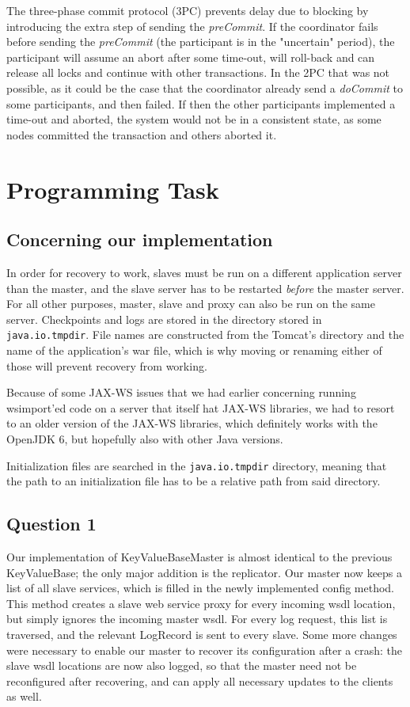 \documentclass[12pt,a4paper,fleqn]{article}
\begin{document}
The three-phase commit protocol (3PC) prevents delay due to blocking by introducing the extra step of sending the \emph{preCommit}. If the coordinator fails before sending the \emph{preCommit} (the participant is in the "uncertain" period), the participant will assume an abort after some time-out, will roll-back and can release all locks and continue with other transactions. In the 2PC that was not possible, as it could be the case that the coordinator already send a \emph{doCommit} to some participants, and then failed. If then the other participants implemented a time-out and aborted, the system would not be in a consistent state, as some nodes committed the transaction and others aborted it.

\section*{Programming Task} 
\label{sec:programming}

\subsection*{Concerning our implementation}
In order for recovery to work, slaves must be run on a different application server than the master, and the slave server has to be restarted \emph{before} the master server. For all other purposes, master, slave and proxy can also be run on the same server. Checkpoints and logs are stored in the directory stored in \texttt{java.io.tmpdir}. File names are constructed from the Tomcat's directory and the name of the application's war file, which is why moving or renaming either of those will prevent recovery from working.

Because of some JAX-WS issues that we had earlier concerning running wsimport'ed code on a server that itself hat JAX-WS libraries, we had to resort to an older version of the JAX-WS libraries, which definitely works with the OpenJDK 6, but hopefully also with other Java versions. 

Initialization files are searched in the \texttt{java.io.tmpdir} directory, meaning that the path to an initialization file has to be a relative path from said directory.

\subsection*{Question 1}
\label{sec:pq1}

Our implementation of KeyValueBaseMaster is almost identical to the previous KeyValueBase; the only major addition is the replicator. Our master now keeps a list of all slave services, which is filled in the newly implemented config method. This method creates a slave web service proxy for every incoming wsdl location, but simply ignores the incoming master wsdl. For every log request, this list is traversed, and the relevant LogRecord is sent to every slave. Some more changes were necessary to enable our master to recover its configuration after a crash: the slave wsdl locations are now also logged, so that the master need not be reconfigured after recovering, and can apply all necessary updates to the clients as well. 
\end{document}
